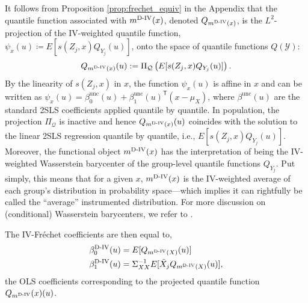 \documentclass[12pt]{article}
\newcommand{\E}{\mathbb{E}}
\newcommand{\T}{\mathsf{T}} %
\newcommand{\est}{\ensuremath{\textnormal{D-IV}}\xspace}
\newcommand{\calQ}{Q(\mathcal{Y})} %
\begin{document}
It follows from Proposition \ref{prop:frechet_equiv} in the Appendix that the quantile function associated with $m^{\est}(x)$, denoted $Q_{m^{\est}(x)}$, is the $L^2$-projection of the IV-weighted quantile function, $\psi_x(u) \coloneqq E[s(Z_j,x)Q_{Y_j}(u)]$, onto the space of quantile functions $\calQ$:
\begin{equation}\label{eq:projection-fivr_intercept_main}
   Q_{m^{\est}(x)}(u) := \Pi_{\mathcal{Q}}\left(E[s(Z_j,x)Q_{Y_j}(u)]\right).
\end{equation}
By the linearity of $s(Z_j,x)$ in $x$, the function $\psi_x(u)$ is affine in $x$ 
and can be written as $\psi_x(u) = \beta_0^{\text{unc}}(u) + 
\beta_1^{\text{unc}}(u)^{\!\T}(x - \mu_X)$, where $\beta^{\text{unc}}(u)$ are the 
standard 2SLS coefficients applied quantile by quantile. In population, the projection $\Pi_{\mathcal{Q}}$ is inactive and hence $Q_{m^{\est}(x)}(u)$ coincides with the solution to the linear 2SLS regression quantile by quantile, i.e., $E[s(Z_j,x)Q_{Y_j}(u)]$. Moreover, the functional object $m^{\est}(x)$ has the interpretation of being the IV-weighted Wasserstein barycenter of the group-level quantile functions $Q_{Y_j}$. Put simply, this means that for a given $x$, $m^{\est}(x)$ is the IV-weighted average of each group's distribution in probability space---which implies it can rightfully be called the ``average'' instrumented distribution. For more discussion on (conditional) Wasserstein barycenters, we refer to \citet{agueh2011barycenters, fan2024conditional, panaretos2020invitation}.

The IV-Fr\'echet coefficients are then equal to,
\begin{align}
& \beta^\est_0(u) = E[Q_{m^\est(X)}(u)] \\
& \beta^\est_1(u) = \Sigma_{XX}^{-1} E[ \tilde{X}_j Q_{m^\est(X)}(u)],
\end{align}
the OLS coefficients corresponding to the projected quantile function $Q_{m^\est}(x)(u)$. 

\end{document}
